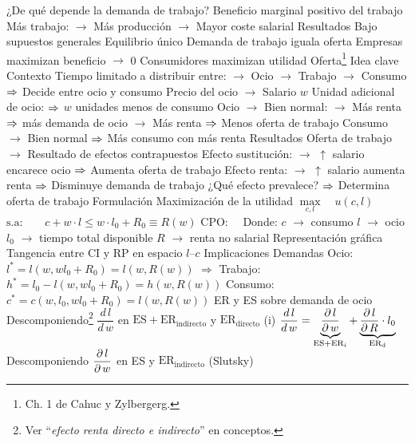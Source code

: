 \documentclass{nuevotema}
\begin{document}
\begin{esquemal}
				\4 ¿De qué depende la demanda de trabajo?
				\4[] Beneficio marginal positivo del trabajo
				\4[] Más trabajo:
				\4[] $\to$ Más producción
				\4[] $\to$ Mayor coste salarial
			\3 Resultados
				\4 Bajo supuestos generales
				\4 Equilibrio único
				\4[] Demanda de trabajo iguala oferta
				\4[] Empresas maximizan beneficio $\to$ 0
				\4[] Consumidores maximizan utilidad
		\2 Oferta\footnote{Ch. 1 de Cahuc y Zylbergerg.}
			\3 Idea clave
				\4 Contexto
				\4[] Tiempo limitado a distribuir entre:
				\4[] $\to$ Ocio
				\4[] $\to$ Trabajo $\to$ Consumo
				\4[] $\Rightarrow$ Decide entre ocio y consumo
				\4[] Precio del ocio
				\4[] $\to$ Salario $w$
				\4[] Unidad adicional de ocio:
				\4[] $\Rightarrow$ $w$ unidades menos de consumo
				\4[] Ocio
				\4[] $\to$ Bien normal:
				\4[] $\to$ Más renta $\Rightarrow$ más demanda de ocio
				\4[] $\to$ Más renta $\Rightarrow$ Menos oferta de trabajo
				\4[] Consumo
				\4[] $\to$ Bien normal
				\4[] $\Rightarrow$ Más consumo con más renta
				\4 Resultados
				\4[] Oferta de trabajo
				\4[] $\to$ Resultado de efectos contrapuestos
				\4[] Efecto sustitución:
				\4[] $\to$ $\uparrow$ salario encarece ocio
				\4[] $\Rightarrow$ Aumenta oferta de trabajo
				\4[] Efecto renta:
				\4[] $\to$ $\uparrow$ salario aumenta renta
				\4[] $\Rightarrow$ Disminuye demanda de trabajo
				\4[] ¿Qué efecto prevalece?
				\4[] $\Rightarrow$ Determina oferta de trabajo
			\3 Formulación
				\4 Maximización de la utilidad
				\4[] $\underset{c,l}{\max} \quad u(c,l)$
				\4[] $\text{s.a:} \quad \quad c + w \cdot l \leq w \cdot l_0 + R_0 \equiv R(w)$
				\4[] $\text{CPO:} \quad$ 
				\4[] Donde:
				\4[] $c$ $\to$ consumo
				\4[] $l$ $\to$ ocio
				\4[] $l_0$ $\to$ tiempo total disponible
				\4[] $R$ $\to$ renta no salarial
				\4 Representación gráfica
				\4[] Tangencia entre CI y RP en espacio $l$--$c$
				\4[] 
			\3 Implicaciones
				\4 Demandas
				\4[] Ocio: $l^* = l(w, wl_0+R_0) = l(w, R(w))$
				\4[] $\Rightarrow$ Trabajo: $h^* = l_0 - l(w, wl_0 + R_0) = h(w,R(w))$
				\4[] Consumo: $c^* = c(w, l_0, wl_0 + R_0) = l(w,R(w))$
				\4 ER y ES sobre demanda de ocio
				\4[] Descomponiendo\footnote{Ver ``\textit{efecto renta directo e indirecto}'' en conceptos.} $\dfrac{d \, l}{d \, w}$ en $\text{ES}+\text{ER}_\text{indirecto}$ y $\text{ER}_\text{directo}$
				\4[] (i) $\dfrac{d \, l}{d \, w} = \underbrace{\dfrac{\partial \, l}{\partial \, w}}_{\text{ES}+\text{ER}_i} + \underbrace{\dfrac{\partial \, l}{\partial \, R} \cdot l_0}_{\text{ER}_\text{d}}$
				\4[] Descomponiendo $\dfrac{\partial \, l}{\partial \, w}$ en ES y $\text{ER}_\text{indirecto}$ (Slutsky)

\end{esquemal}
\end{document}

